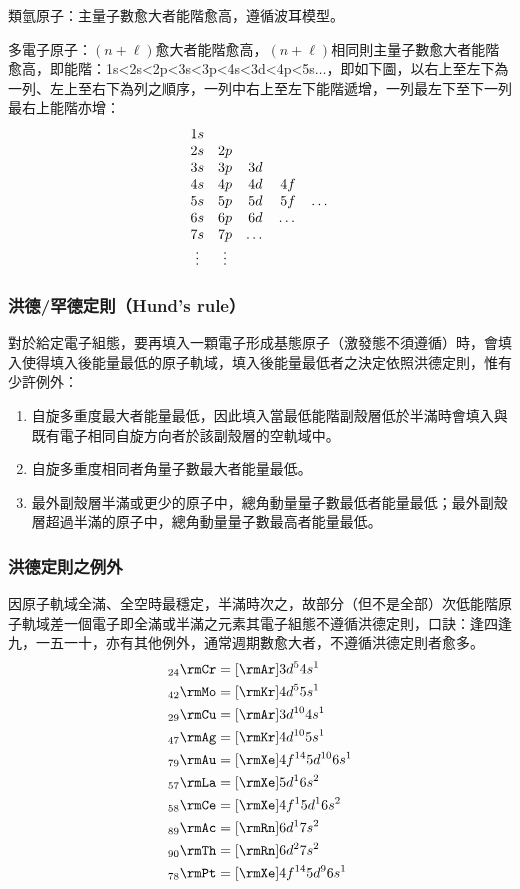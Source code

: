 \documentclass[a4paper,12pt]{report}
\begin{document}
\bit
\item 類氫原子：主量子數愈大者能階愈高，遵循波耳模型。
\item 多電子原子：$(n+\ell)$愈大者能階愈高，$(n+\ell)$相同則主量子數愈大者能階愈高，即能階：1s<2s<2p<3s<3p<4s<3d<4p<5s$\ldots$，即如下圖，以右上至左下為一列、左上至右下為列之順序，一列中右上至左下能階遞增，一列最左下至下一列最右上能階亦增：
\[\begin{array}{cccccc}
1s\\
2s & 2p \\
3s & 3p & 3d \\
4s & 4p & 4d & 4f \\
5s & 5p & 5d & 5f & $\ldots$ \\
6s & 6p & 6d & $\ldots$ \\
7s & 7p & $\ldots$ \\
$\vdots$ & $\vdots$ &
\end{array}\]
\eit
\subsubsection{洪德/罕德定則（Hund's rule）}
對於給定電子組態，要再填入一顆電子形成基態原子（激發態不須遵循）時，會填入使得填入後能量最低的原子軌域，填入後能量最低者之決定依照洪德定則，惟有少許例外：
\begin{enumerate}
\item 自旋多重度最大者能量最低，因此填入當最低能階副殼層低於半滿時會填入與既有電子相同自旋方向者於該副殼層的空軌域中。
\item 自旋多重度相同者角量子數最大者能量最低。
\item 最外副殼層半滿或更少的原子中，總角動量量子數最低者能量最低；最外副殼層超過半滿的原子中，總角動量量子數最高者能量最低。
\end{enumerate}
\subsubsection{洪德定則之例外}
因原子軌域全滿、全空時最穩定，半滿時次之，故部分（但不是全部）次低能階原子軌域差一個電子即全滿或半滿之元素其電子組態不遵循洪德定則，口訣：逢四逢九，一五一十，亦有其他例外，通常週期數愈大者，不遵循洪德定則者愈多。
\[\begin{aligned}
& _{24}\rmCr = [\rmAr] 3d^5 4s^1\\
& _{42}\rmMo = [\rmKr] 4d^5 5s^1\\
& _{29}\rmCu = [\rmAr] 3d^{10} 4s^1\\
& _{47}\rmAg = [\rmKr] 4d^{10} 5s^1\\
& _{79}\rmAu = [\rmXe] 4f^{14} 5d^{10} 6s^1\\
& _{57}\rmLa = [\rmXe] 5d^1 6s^2\\
& _{58}\rmCe = [\rmXe] 4f^1 5d^1 6s^2\\
& _{89}\rmAc = [\rmRn] 6d^1 7s^2\\
& _{90}\rmTh = [\rmRn] 6d^2 7s^2\\
& _{78}\rmPt = [\rmXe] 4f^{14} 5d^9 6s^1
\end{aligned}\]
\end{document}

